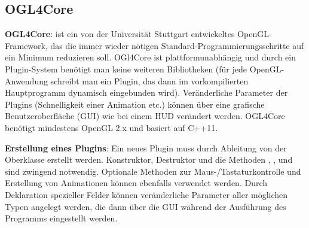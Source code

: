 \subsection{%
    OGL4Core%
}

\textbf{OGL4Core}:
 ist ein von der Universität Stuttgart entwickeltes OpenGL-Framework,
das die immer wieder nötigen Standard-Programmierungsschritte auf ein Minimum reduzieren soll.
OGl4Core ist plattformunabhängig und durch ein Plugin-System benötigt man keine weiteren
Bibliotheken
(für jede OpenGL-Anwendung schreibt man ein Plugin, das dann im vorkompilierten Hauptprogramm
dynamisch eingebunden wird).
Veränderliche Parameter der Plugins (Schnelligkeit einer Animation etc.)
können über eine grafische Benutzeroberfläche (GUI) wie bei einem HUD verändert werden.
OGL4Core benötigt mindestens OpenGL 2.x und basiert auf C++11.

\textbf{Erstellung eines Plugins}:
Ein neues Plugin muss durch Ableitung von der Oberklasse  erstellt werden.
Konstruktor, Destruktor und die Methoden , ,  und
 sind zwingend notwendig.
Optionale Methoden zur Maus-/Tastaturkontrolle und Erstellung von Animationen können ebenfalls
verwendet werden.
Durch Deklaration spezieller Felder können veränderliche Parameter aller möglichen Typen
angelegt werden, die dann über die GUI während der Ausführung des Programms eingestellt werden.

\pagebreak
